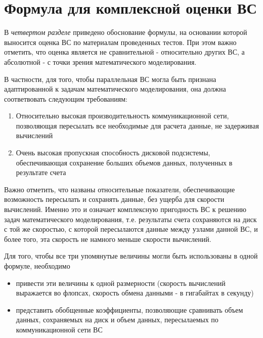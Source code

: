 \clearpage



%		
%		

\section{Формула для комплексной оценки ВС}
\label{complex_evaluation}
В \textit{четвертом разделе} приведено обоснование формулы, на основании которой выносится оценка ВС по материалам проведенных тестов. При этом важно отметить, что оценка является не сравнительной - относительно других ВС, а абсолютной - с точки зрения математического моделирования. 

В частности, для того, чтобы параллельная ВС могла быть признана адаптированной к задачам математического моделирования, она должна соответвовать следующим требованиям:
\begin{enumerate}
	\item Относительно высокая производительность коммуникационной сети, позволяющая пересылать все необходимые для расчета данные, не задерживая вычислений
	\item Очень высокая пропускная способность дисковой подсистемы, обеспечивающая сохранение больших объемов данных, полученных в результате счета  	
\end{enumerate}

Важно отметить, что названы относительные показатели, обеспечивающие возможность пересылать и сохранять данные, без ущерба для скорости вычислений. Именно это и означает  комплексную пригодность ВС к решению задач математического моделирования, т.е. результаты счета сохраняются на диск с той же скоростью, с которой пересылаются данные между узлами данной ВС, и более того, эта скорость не намного меньше скорости вычислений.

Для того, чтобы все три упомянутые величины могли быть использованы в одной формуле, необходимо 
\begin{itemize}
	\item привести эти величины к одной размерности (скорость вычислений выражается во флопсах, скорость обмена данными - в гигабайтах в секунду)
	\item представить обобщенные коэффициенты, позволяющие сравнивать объем данных, сохраняемых на диск и объем данных, пересылаемых по коммуникационной сети ВС  
\end{itemize}


